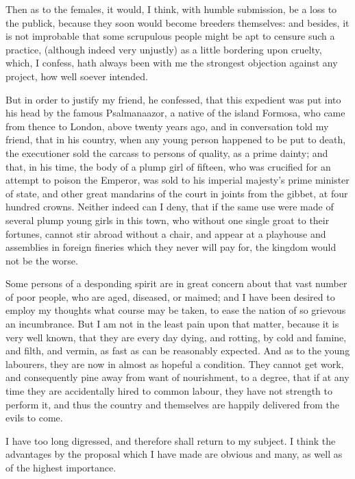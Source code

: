 Then as to the females, it would, I think, with humble submission, be a loss to the publick, because they soon would become breeders themselves: and besides, it is not improbable that some scrupulous people might be apt to censure such a practice, (although indeed very unjustly) as a little bordering upon cruelty, which, I confess, hath always been with me the strongest objection against any project, how well soever intended.\par

But in order to justify my friend, he confessed, that this expedient was put into his head by the famous Psalmanaazor, a native of the island Formosa, who came from thence to London, above twenty years ago, and in conversation told my friend, that in his country, when any young person happened to be put to death, the executioner sold the carcass to persons of quality, as a prime dainty; and that, in his time, the body of a plump girl of fifteen, who was crucified for an attempt to poison the Emperor, was sold to his imperial majesty’s prime minister of state, and other great mandarins of the court in joints from the gibbet, at four hundred crowns. Neither indeed can I deny, that if the same use were made of several plump young girls in this town, who without one single groat to their fortunes, cannot stir abroad without a chair, and appear at a playhouse and assemblies in foreign fineries which they never will pay for, the kingdom would not be the worse.\par

Some persons of a desponding spirit are in great concern about that vast number of poor people, who are aged, diseased, or maimed; and I have been desired to employ my thoughts what course may be taken, to ease the nation of so grievous an incumbrance. But I am not in the least pain upon that matter, because it is very well known, that they are every day dying, and rotting, by cold and famine, and filth, and vermin, as fast as can be reasonably expected. And as to the young labourers, they are now in almost as hopeful a condition. They cannot get work, and consequently pine away from want of nourishment, to a degree, that if at any time they are accidentally hired to common labour, they have not strength to perform it, and thus the country and themselves are happily delivered from the evils to come.\par

I have too long digressed, and therefore shall return to my subject. I think the advantages by the proposal which I have made are obvious and many, as well as of the highest importance.\par

